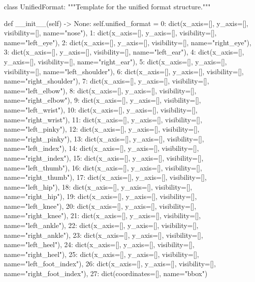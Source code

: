 \startPY
class UnifiedFormat:
    """Template for the unified format structure."""

    def __init__(self) -> None:
        self.unified_format = {
        0: dict(x_axis=[], y_axis=[], visibility=[], name="nose"),
        1: dict(x_axis=[], y_axis=[], visibility=[], name="left_eye"),
        2: dict(x_axis=[], y_axis=[], visibility=[], name="right_eye"),
        3: dict(x_axis=[], y_axis=[], visibility=[], name="left_ear"),
        4: dict(x_axis=[], y_axis=[], visibility=[], name="right_ear"),
        5: dict(x_axis=[], y_axis=[], visibility=[], name="left_shoulder"),
        6: dict(x_axis=[], y_axis=[], visibility=[], name="right_shoulder"),
        7: dict(x_axis=[], y_axis=[], visibility=[], name="left_elbow"),
        8: dict(x_axis=[], y_axis=[], visibility=[], name="right_elbow"),
        9: dict(x_axis=[], y_axis=[], visibility=[], name="left_wrist"),
        10: dict(x_axis=[], y_axis=[], visibility=[], name="right_wrist"),
        11: dict(x_axis=[], y_axis=[], visibility=[], name="left_pinky"),
        12: dict(x_axis=[], y_axis=[], visibility=[], name="right_pinky"),
        13: dict(x_axis=[], y_axis=[], visibility=[], name="left_index"),
        14: dict(x_axis=[], y_axis=[], visibility=[], name="right_index"),
        15: dict(x_axis=[], y_axis=[], visibility=[], name="left_thumb"),
        16: dict(x_axis=[], y_axis=[], visibility=[], name="right_thumb"),
        17: dict(x_axis=[], y_axis=[], visibility=[], name="left_hip"),
        18: dict(x_axis=[], y_axis=[], visibility=[], name="right_hip"),
        19: dict(x_axis=[], y_axis=[], visibility=[], name="left_knee"),
        20: dict(x_axis=[], y_axis=[], visibility=[], name="right_knee"),
        21: dict(x_axis=[], y_axis=[], visibility=[], name="left_ankle"),
        22: dict(x_axis=[], y_axis=[], visibility=[], name="right_ankle"),
        23: dict(x_axis=[], y_axis=[], visibility=[], name="left_heel"),
        24: dict(x_axis=[], y_axis=[], visibility=[], name="right_heel"),
        25: dict(x_axis=[], y_axis=[], visibility=[], name="left_foot_index"),
        26: dict(x_axis=[], y_axis=[], visibility=[], name="right_foot_index"),
        27: dict(coordinates=[], name="bbox")
        }
\stopPY
\stopbuffer
